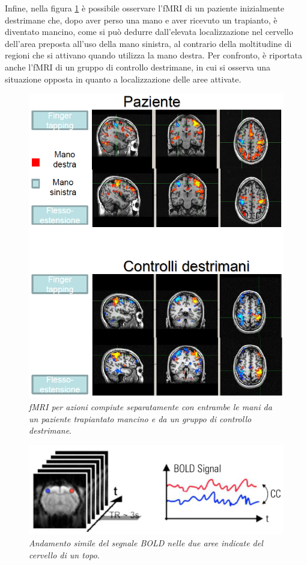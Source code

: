 \documentclass{report}
\newcommand{\figref}[1]{figura \ref{#1}}
\numberwithin{equation}{section}
\numberwithin{figure}{section}
\begin{document}
Infine, nella \figref{fig:trapianto} è possibile osservare l'fMRI di un paziente inizialmente destrimane che, dopo aver perso una mano e aver ricevuto un trapianto, è diventato mancino, come si può dedurre dall'elevata localizzazione nel cervello dell'area preposta all'uso della mano sinistra, al contrario della moltitudine di regioni che si attivano quando utilizza la mano destra. Per confronto, è riportata anche l'fMRI di un gruppo di controllo destrimane, in cui si osserva una situazione opposta in quanto a localizzazione delle aree attivate.

\begin{figure}[htp]
\centering
\includegraphics[scale=0.93]{immagini/trapianto.png}
\caption{\label{fig:trapianto} \textit{fMRI per azioni compiute separatamente con entrambe le mani da un paziente trapiantato mancino e da un gruppo di controllo destrimane}.}
\end{figure}

\begin{figure}[htp]
\centering
\includegraphics[scale=0.8]{immagini/topo.png}
\caption{\label{fig:topo} \textit{Andamento simile del segnale BOLD nelle due aree indicate del cervello di un topo}.}
\end{figure}
\end{document}
